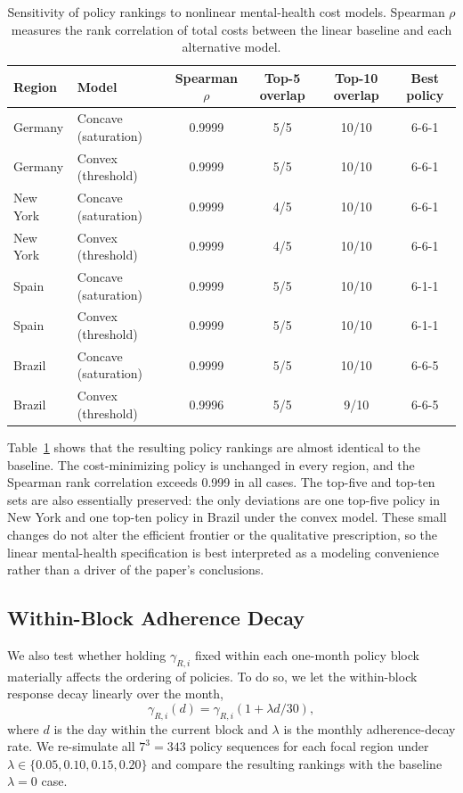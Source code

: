 \documentclass[msom,blindrev]{informs3} %
\newcommand{\rev}[1]{{\color{blue}#1}}
\begin{document}
\begin{APPENDICES}
\begin{table}[htbp!]
\centering\small
\caption{\rev{Sensitivity of policy rankings to nonlinear mental-health cost models. Spearman $\rho$ measures the rank correlation of total costs between the linear baseline and each alternative model.}}
\label{tab:mh_sensitivity}
{\color{blue}
\begin{tabular}{llcccc}
\toprule
Region & Model & Spearman $\rho$ & Top-5 overlap & Top-10 overlap & Best policy \\
\midrule
Germany    & Concave (saturation) & 0.9999 & 5/5 & 10/10 & 6-6-1 \\
Germany    & Convex (threshold)   & 0.9999 & 5/5 & 10/10 & 6-6-1 \\
New York   & Concave (saturation) & 0.9999 & 4/5 & 10/10 & 6-6-1 \\
New York   & Convex (threshold)   & 0.9999 & 4/5 & 10/10 & 6-6-1 \\
Spain      & Concave (saturation) & 0.9999 & 5/5 & 10/10 & 6-1-1 \\
Spain      & Convex (threshold)   & 0.9999 & 5/5 & 10/10 & 6-1-1 \\
Brazil     & Concave (saturation) & 0.9999 & 5/5 & 10/10 & 6-6-5 \\
Brazil     & Convex (threshold)   & 0.9996 & 5/5 & 9/10  & 6-6-5 \\
\bottomrule
\end{tabular}
}
\end{table}

{\color{blue}
Table~\ref{tab:mh_sensitivity} shows that the resulting policy rankings are almost identical to the baseline. The cost-minimizing policy is unchanged in every region, and the Spearman rank correlation exceeds 0.999 in all cases. The top-five and top-ten sets are also essentially preserved: the only deviations are one top-five policy in New York and one top-ten policy in Brazil under the convex model. These small changes do not alter the efficient frontier or the qualitative prescription, so the linear mental-health specification is best interpreted as a modeling convenience rather than a driver of the paper's conclusions.
}

{\color{blue}
\subsection{\rev{Within-Block Adherence Decay}}
\label{app:addsens_adherence}

We also test whether holding $\gamma_{R,i}$ fixed within each one-month policy block materially affects the ordering of policies. To do so, we let the within-block response decay linearly over the month,
\[
\gamma_{R,i}(d)=\gamma_{R,i}\left(1+\lambda d/30\right),
\]
where $d$ is the day within the current block and $\lambda$ is the monthly adherence-decay rate. We re-simulate all $7^3=343$ policy sequences for each focal region under $\lambda \in \{0.05,0.10,0.15,0.20\}$ and compare the resulting rankings with the baseline $\lambda=0$ case.
}


\end{APPENDICES}
\end{document}
